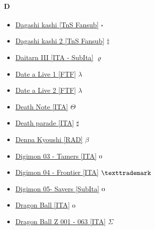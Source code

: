 		\paragraph{D} \hypertarget{SD}{}
			\begin{itemize}
				\item \href{https://mega.nz/#F!b1UmkQpI!WQACVo7J7hnodPDnQtZ0ug} {Dagashi kashi [TnS Fansub]}  $\square$ \\ 
				\item \href{https://mega.nz/#F!Tr4ijSQL!ky6WSQ01C2xP396QrYTLtg} {Dagashi kashi 2 [TnS Fansub]}  $\ddag$ \\ 
				\item \href{https://mega.nz/#F!oDBzXJQL!JKzvY29YeFaQcxGAxAGsRg} {Daitarn III [ITA - SubIta]}  $\varrho$ \\ 
				\item \href{https://mega.nz/#F!akZX0bja!uV3eyjDLP6uZMTEyNdKBrg} {Date a Live 1 [FTF]}  $\lambda$ \\ 
				\item \href{https://mega.nz/#F!r4ogwRbQ!REoKx5SNuA7UOibznzTGmQ} {Date a Live 2 [FTF]}  $\lambda$ \\ 
				\item \href{https://mega.nz/#F!kHRnnDya!7gdf2RpnaCRuzci5cMWSWA} {Death Note [ITA]}  $\varTheta$ \\
				\item \href{https://mega.nz/#F!QnJgRBII!tePL1MYxWKgSSyOCbWztRA} {Death parade [ITA]}  $\sharp$ \\ 
				\item \href{https://mega.nz/#F!7gwmERxI!792CB_l8F6pnwn84WpH6QQ} {Denpa Kyoushi [RAD]}  $\beta$ \\ 
				\item \href{https://mega.nz/#F!6mBXRRoQ!kDZ7wDyECvzFbQiqmym7FA} {Digimon 03 - Tamers [ITA]}  $\oldstylenums{0}$ \\ 
				\item \href{https://mega.nz/#F!KmpkiZiT!AVEJc1rOhuYzb8Tna-0RAw} {Digimon 04 - Frontier [ITA]}  $\texttrademark$ \\ 
				\item \href{https://mega.nz/#F!O34GFBgY!V3OcxRw-nAk3bx31Dlfe6g} {Digimon 05- Savers [SubIta]}  $\oldstylenums{0}$ \\ 
				\item \href{https://mega.nz/#F!PqoRgaqI!wCwnk1OYT9gky0RhyUkwUQ} {Dragon Ball [ITA]}  $\oldstylenums{0}$ \\ 
				\item \href{https://mega.nz/#F!JPxiDSgR!7dds3yZq9PhOutOEAn0C0Q} {Dragon Ball Z 001 - 063 [ITA]}  $\varSigma$ \\ 

\end{itemize}

